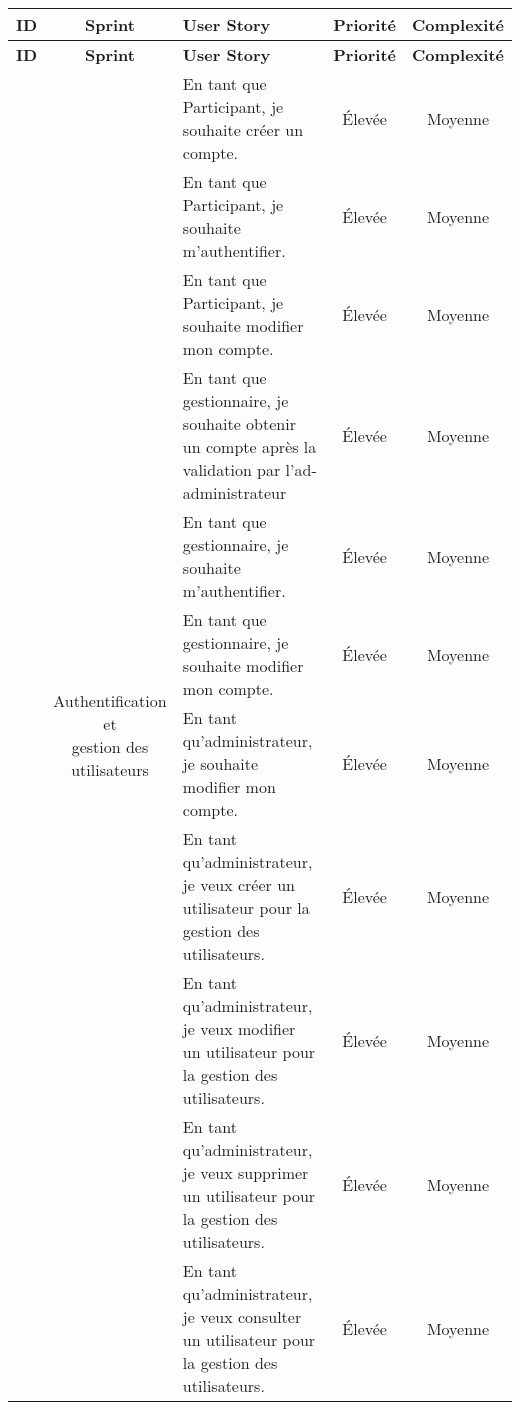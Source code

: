 \clearpage
\renewcommand{\arraystretch}{1.6}
\setlength{\tabcolsep}{5pt}
\begin{longtable}{|c|c|m{7cm}|c|c|}
\hline
\textbf{ID} & \textbf{Sprint} & \textbf{User Story} & \textbf{Priorité} & \textbf{Complexité} \\
\hline
\endfirsthead

\hline
\textbf{ID} & \textbf{Sprint} & \textbf{User Story} & \textbf{Priorité} & \textbf{Complexité} \\
\hline
\endhead

\hline
\endfoot

\hline
\endlastfoot

\multirow{11}{*}{2} & \multirow{11}{*}{\parbox{3cm}{\centering Authentification et\\ gestion des utilisateurs}} 
& En tant que Participant, je souhaite créer un compte. & Élevée & Moyenne \\
\cline{3-5}
&& En tant que Participant, je souhaite m’authentifier. & Élevée & Moyenne \\
\cline{3-5}
&& En tant que Participant, je souhaite modifier mon compte. & Élevée & Moyenne \\
\cline{3-5}

&& En tant que gestionnaire, je souhaite obtenir un compte après la validation par l’ad-
administrateur & Élevée & Moyenne \\
\cline{3-5}
&& En tant que gestionnaire, je souhaite m’authentifier. & Élevée & Moyenne \\
\cline{3-5}
&& En tant que gestionnaire, je souhaite modifier mon compte. & Élevée & Moyenne \\
\cline{3-5}
&& En tant qu'administrateur, je souhaite modifier mon compte. & Élevée & Moyenne \\
\cline{3-5}
&& En tant qu’administrateur, je veux créer un utilisateur pour la gestion des utilisateurs. & Élevée & Moyenne \\
\cline{3-5}
&& En tant qu’administrateur, je veux modifier un utilisateur pour la gestion des utilisateurs. & Élevée & Moyenne \\
\cline{3-5}
&& En tant qu’administrateur, je veux supprimer un utilisateur pour la gestion des utilisateurs. & Élevée & Moyenne \\
\cline{3-5}
&& En tant qu’administrateur, je veux consulter un utilisateur pour la gestion des utilisateurs. & Élevée & Moyenne \\
\hline
\end{longtable}

